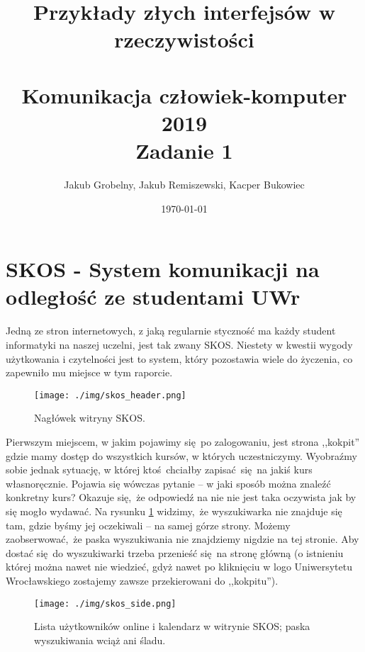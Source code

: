 \documentclass[12pt, a4paper, oneside]{report}
\title{\Huge \textbf{Przykłady złych interfejsów w rzeczywistości}\\\,\\
       \Large Komunikacja człowiek-komputer 2019\\
       Zadanie 1}
\date{\today}
\author{Jakub Grobelny, Jakub Remiszewski, Kacper Bukowiec}
\begin{document}
\begin{titlepage}
    \maketitle
    \thispagestyle{empty}
\end{titlepage}

\renewcommand*\thesubsection{\arabic{section}}


\chapter*{SKOS - System komunikacji na odległość ze studentami UWr}

Jedną ze stron internetowych, z jaką regularnie styczność ma każdy student
informatyki na naszej uczelni, jest tak zwany SKOS. Niestety w kwestii wygody
użytkowania i czytelności jest to system, który pozostawia wiele do życzenia, 
co zapewniło mu miejsce w tym raporcie. \\

\begin{figure}[H]
    \centering
    \texttt{[image: ./img/skos\_header.png]}
    \caption{Nagłówek witryny SKOS.}
    \label{figure:skos-header}
\end{figure}

Pierwszym miejscem, w jakim pojawimy się po zalogowaniu, jest strona
,,kokpit'' gdzie mamy dostęp do wszystkich kursów, w których uczestniczymy.
Wyobraźmy sobie jednak sytuację, w której ktoś chciałby zapisać się na jakiś
kurs własnoręcznie. Pojawia się wówczas pytanie -- w jaki sposób można znaleźć
konkretny kurs? Okazuje się, że odpowiedź na nie nie jest taka oczywista jak
by się mogło wydawać. Na rysunku \ref{figure:skos-header} widzimy, że 
wyszukiwarka nie znajduje się tam, gdzie byśmy jej oczekiwali -- na samej górze 
strony. Możemy zaobserwować, że paska wyszukiwania nie znajdziemy nigdzie na tej 
stronie. Aby dostać się do wyszukiwarki  trzeba przenieść się na stronę główną
(o istnieniu której można nawet nie wiedzieć, gdyż nawet po kliknięciu w logo 
Uniwersytetu Wrocławskiego zostajemy zawsze przekierowani do ,,kokpitu'').

\begin{figure}
    \centering
    \texttt{[image: ./img/skos\_side.png]}
    \caption{Lista użytkowników online i kalendarz w witrynie SKOS; paska 
             wyszukiwania wciąż ani śladu.}
    \label{figure:skos-side}
\end{figure}
\end{document}
